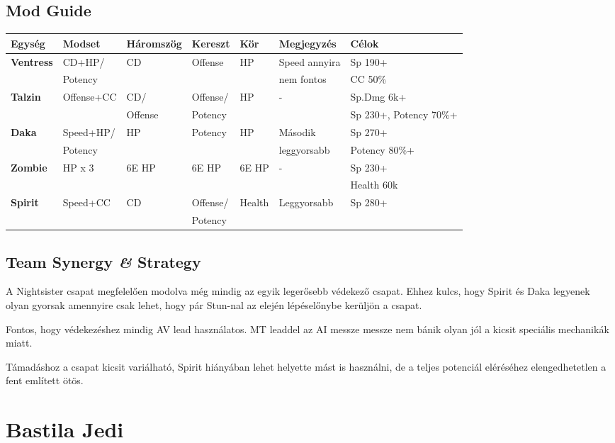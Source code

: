 \documentclass[11pt]{report}
\begin{document}
\section{Mod Guide}
\begin{center}
    \begin{tabular}{|l | l | l | l | l | l | l |}
        \hline
        Egység & Modset & Háromszög & Kereszt & Kör & Megjegyzés & Célok\\ \hline
        \textbf{Ventress} & CD+HP/ & CD & Offense & HP & Speed annyira & Sp 190+\\
        & Potency &  &  &  &  nem fontos & CC 50\%\\ \hline
        \textbf{Talzin} & Offense+CC & CD/ & Offense/ & HP & - & Sp.Dmg 6k+\\
        &  & Offense & Potency &  &  & Sp 230+, Potency 70\%+\\ \hline
        \textbf{Daka} & Speed+HP/ & HP & Potency & HP & Második & Sp 270+\\
        & Potency &  &  &  & leggyorsabb & Potency 80\%+\\ \hline
        \textbf{Zombie} & HP x 3 & 6E HP & 6E HP & 6E HP & - & Sp 230+\\
        &  &  &  &  &  & Health 60k\\ \hline
        \textbf{Spirit} & Speed+CC & CD & Offense/ & Health & Leggyorsabb & Sp 280+\\
        &  &  & Potency &  &  & \\ \hline
    \end{tabular}
\end{center}
\section{Team Synergy \textit{\&} Strategy}
A Nightsister csapat megfelelően modolva még mindig az egyik legerősebb védekező csapat. Ehhez kulcs, hogy Spirit és Daka legyenek olyan gyorsak amennyire csak lehet, hogy pár Stun-nal az elején lépéselőnybe kerüljön a csapat.\par
Fontos, hogy védekezéshez mindig AV lead használatos. MT leaddel az AI messze messze nem bánik olyan jól a kicsit speciális mechanikák miatt.\par
Támadáshoz a csapat kicsit variálható, Spirit hiányában lehet helyette mást is használni, de a teljes potenciál eléréséhez elengedhetetlen a fent említett ötös.

\chapter{Bastila Jedi}
\end{document}
